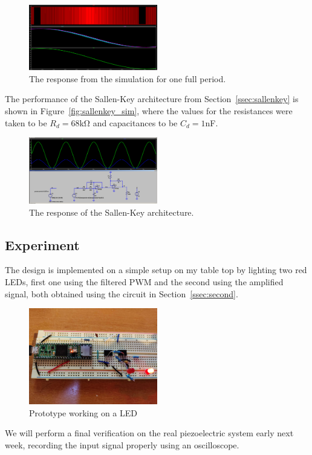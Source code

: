\begin{figure}[t]
\includegraphics[width=0.5\textwidth]{./figures/pwm_filtered_one_two_final_signal.png}
\caption{The response from the simulation for one full period.} 
\label{fig:response}
\end{figure}


The performance of the Sallen-Key architecture from Section~\ref{ssec:sallenkey}
is shown in Figure~\ref{fig:sallenkey_sim}, where the values for the resistances
were taken to be $R_d = 68$\unit{\kilo\ohm} and capacitances to be $C_d =
1$\unit{\nano\farad}.

\begin{figure}[t]
\includegraphics[width=0.5\textwidth]{./figures/sallenkey.png}
\caption{The response of the Sallen-Key architecture.}
\label{fig:sallankey_sim}
\end{figure}


\vspace{-1em}
\subsection{Experiment}
\vspace{-1em}

The design is implemented on a simple setup on my table top by lighting two red
LEDs, first one using the filtered PWM and the second using the amplified
signal, both obtained using the circuit in Section~\ref{ssec:second}.

\begin{figure}[t]
\includegraphics[width=0.5\textwidth]{./figures/prototype.jpg}
\caption{Prototype working on a LED} 
\label{fig:exp}
\end{figure}

We will perform a final verification on the real piezoelectric system early next
week, recording the input signal properly using an oscilloscope.
